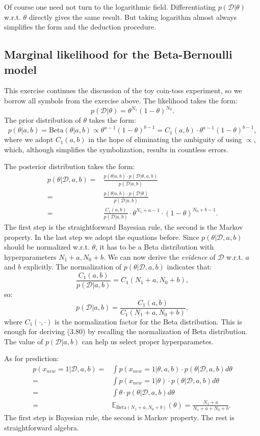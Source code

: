 \documentclass[UTF8]{ctexart}
\begin{document}
Of course one need not turn to the logarithmic field. 
Differentiating $p(\mathcal{D}|\theta)$ w.r.t. $\theta$ directly gives the same result. 
But taking logarithm almost always simplifies the form and the deduction procedure. 

\subsection{Marginal likelihood for the Beta-Bernoulli model}
This exercise continues the discussion of the toy coin-toss experiment, so we borrow all symbols from the exercise above. 
The likelihood takes the form:
$$p(\mathcal{D}|\theta) = \theta^{N_{1}}(1-\theta)^{N_{0}}.$$
The prior distribution of $\theta$ takes the form:
$$p(\theta|a,b)=\text{Beta}(\theta|a,b)\propto \theta^{a-1}(1-\theta)^{b-1}=C_{1}(a,b)\cdot \theta^{a-1}(1-\theta)^{b-1},$$
where we adopt $C_{1}(a,b)$ in the hope of eliminating the ambiguity of using $\propto$, which, although simplifies the symbolization, results in countless errors. 

The posterior distribution takes the form:
$$
\begin{aligned}
p(\theta|\mathcal{D},a,b) =& \frac{p(\theta|a,b)\cdot p(\mathcal{D}|\theta,a,b)}{p(\mathcal{D}|a,b)} \\
=&\frac{p(\theta|a,b)\cdot p(\mathcal{D}|\theta)}{p(\mathcal{D}|a,b)} \\
=&\frac{C_{1}(a,b)}{p(\mathcal{D}|a,b)}\cdot \theta^{N_{1}+a-1}\cdot (1-\theta)^{N_{0}+b-1}.\nonumber
\end{aligned}
$$
The first step is the straightforward Bayesian rule, the second is the Markov property.
In the last step we adopt the equations before. 
Since $p(\theta|\mathcal{D},a,b)$ should be normalized w.r.t. $\theta$, it has to be a Beta distribution with hyperparameters $N_{1}+a,N_{0}+b$.
We can now derive the \emph{evidence} of $\mathcal{D}$ w.r.t. $a$ and $b$ explicitly.
The normalization of $p(\theta|\mathcal{D},a,b)$ indicates that:
$$\frac{C_{1}(a,b)}{p(\mathcal{D}|a,b)}=C_{1}(N_{1}+a,N_{0}+b),$$
so:
$$p(\mathcal{D}|a,b)=\frac{C_{1}(a,b)}{C_{1}(N_{1}+a,N_{0}+b)},$$
where $C_{1}(\cdot,\cdot)$ is the normalization factor for the Beta distribution. 
This is enough for deriving (3.80) by recalling the normalization of Beta distribution. 
The value of $p(\mathcal{D}|a,b)$ can help us select proper hyperparametes. 

As for prediction:
$$
\begin{aligned}
p(x_{new}=1|\mathcal{D},a,b)=&\int p(x_{new}=1|\theta,a,b)\cdot p(\theta|\mathcal{D},a,b) d\theta \\
=&\int p(x_{new}=1|\theta)\cdot p(\theta|\mathcal{D},a,b) d\theta \\
=&\int \theta\cdot p(\theta|\mathcal{D},a,b) d\theta \\
=& \mathbb{E}_{\text{Beta}(N_{1}+a,N_{0}+b)}(\theta) = \frac{N_{1}+a}{N_{1}+a+N_{0}+b}.
\end{aligned}
$$
The first step is Bayesian rule, the second is Markov property. 
The rest is straightforward algebra. 
\end{document}
